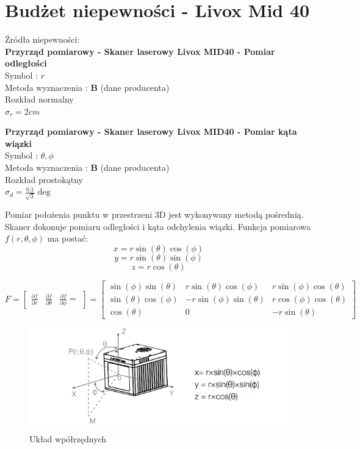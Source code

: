 \documentclass{article}
\begin{document}
\section {Budżet niepewności - Livox Mid 40}

Źródła niepewności: \\
\textbf{Przyrząd pomiarowy - Skaner laserowy Livox MID40 - Pomiar odległości}\\
Symbol : $r$\\
Metoda wyznaczenia : \textbf{B} (dane producenta)\\
Rozkład normalny \\
$\sigma_{r} = 2cm$

\textbf{Przyrząd pomiarowy - Skaner laserowy Livox MID40 - Pomiar kąta wiązki}\\
Symbol : $\theta, \phi$\\
Metoda wyznaczenia : \textbf{B} (dane producenta)\\
Rozkład prostokątny \\
$\sigma_{d} = \frac{0.1}{\sqrt{3}} \deg$


Pomiar położenia punktu w przestrzeni 3D jest wykonywany metodą pośrednią.
Skaner dokonuje pomiaru odległości i kąta odchylenia wiązki.
Funkcja pomiarowa $f(r,\theta, \phi)$ ma postać:
\begin{equation}
x = r \sin(\theta) \cos(\phi)
\end{equation}
\begin{equation}
y = r \sin(\theta) \sin(\phi)
\end{equation}
\begin{equation}
z = r \cos (\theta)
\end{equation}


\begin{equation}
F = \begin{bmatrix}
\frac{\partial f}{\partial r}&
\frac{\partial f}{\partial \theta}&
\frac{\partial f}{\partial \phi}=
\end{bmatrix}=
\left[\begin{matrix}\sin{\left(\phi \right)} \sin{\left(\theta \right)} & r \sin{\left(\theta \right)} \cos{\left(\phi \right)} & r \sin{\left(\phi \right)} \cos{\left(\theta \right)}\\\sin{\left(\theta \right)} \cos{\left(\phi \right)} & - r \sin{\left(\phi \right)} \sin{\left(\theta \right)} & r \cos{\left(\phi \right)} \cos{\left(\theta \right)}\\\cos{\left(\theta \right)} & 0 & - r \sin{\left(\theta \right)}\end{matrix}\right]
\end{equation}
\begin{figure}[htp!]
	\centering
	\includegraphics[width=0.7\linewidth]{livox_co.png}
	\caption{Układ wpółrzędnych}
	\label{fig:livoxco}
\end{figure}
\end{document}
